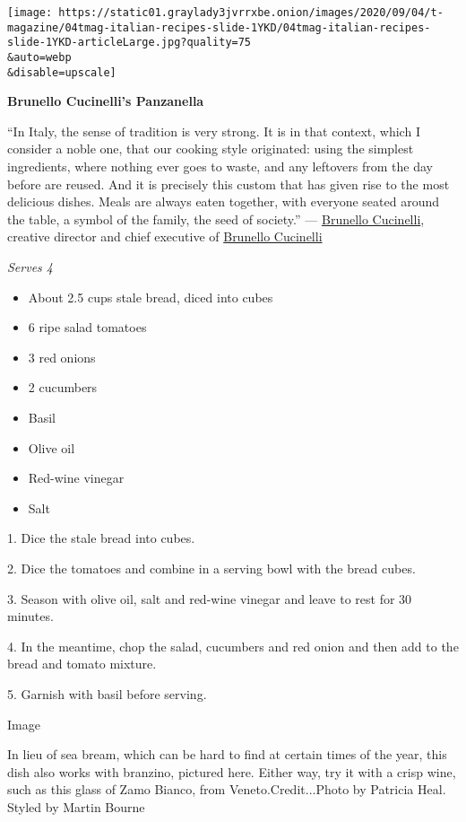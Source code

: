 \texttt{[image: https://static01.graylady3jvrrxbe.onion/images/2020/09/04/t-magazine/04tmag-italian-recipes-slide-1YKD/04tmag-italian-recipes-slide-1YKD-articleLarge.jpg?quality=75\\\&auto=webp\\\&disable=upscale]}

\textbf{Brunello Cucinelli's Panzanella}

``In Italy, the sense of tradition is very strong. It is in that
context, which I consider a noble one, that our cooking style
originated: using the simplest ingredients, where nothing ever goes to
waste, and any leftovers from the day before are reused. And it is
precisely this custom that has given rise to the most delicious dishes.
Meals are always eaten together, with everyone seated around the table,
a symbol of the family, the seed of society.'' ---
\href{https://www.nytimes3xbfgragh.onion/2019/09/06/t-magazine/brunello-cucinelli.html}{Brunello
Cucinelli}, creative director and chief executive of
\href{https://shop.brunellocucinelli.com/en-us/}{Brunello Cucinelli}

\emph{Serves 4}

\begin{itemize}
\item
  About 2.5 cups stale bread, diced into cubes
\item
  6 ripe salad tomatoes
\item
  3 red onions
\item
  2 cucumbers
\item
  Basil
\item
  Olive oil
\item
  Red-wine vinegar
\item
  Salt
\end{itemize}

1. Dice the stale bread into cubes.

2. Dice the tomatoes and combine in a serving bowl with the bread cubes.

3. Season with olive oil, salt and red-wine vinegar and leave to rest
for 30 minutes.

4. In the meantime, chop the salad, cucumbers and red onion and then add
to the bread and tomato mixture.

5. Garnish with basil before serving.

Image

In lieu of sea bream, which can be hard to find at certain times of the
year, this dish also works with branzino, pictured here. Either way, try
it with a crisp wine, such as this glass of Zamo Bianco, from
Veneto.Credit...Photo by Patricia Heal. Styled by Martin Bourne


